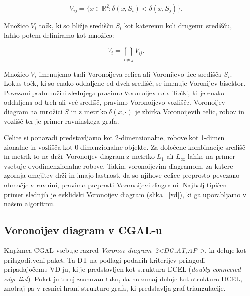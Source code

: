 \documentclass[a4paper, 12pt]{book}
\newcommand{\U}{\texttt{\_}}
\begin{document}
\begin{equation}
V_{ij} = \{x \in \mathbb{R}^2: \delta(x,S_i) < \delta(x,S_j)\}. 
\end{equation}

Množico $V_i$ točk, ki so bližje središču $S_i$ kot kateremu koli drugemu središču, lahko potem definiramo kot množico:

\begin{equation}
V_i = \bigcap_{i \neq j} V_{ij} .
\end{equation}

Množico $V_i$ imenujemo tudi Voronoijeva celica ali Voronijevo lice središča $S_i$. Lokus točk, ki so enako oddaljene od dveh središč, se imenuje Voronijev bisektor. Povezani podmnožici slednjega pravimo Voronoijev rob. Točki, ki je enako oddaljena od treh ali več središč, pravimo Voronoijevo vozlišče. Voronoijev diagram na množici $S$ in z metriko $\delta(x,\cdot)$ je zbirka Voronoijevih celic, robov in vozlišč ter je primer ravninskega grafa.

Celice si ponavadi predstavljamo kot 2-dimenzionalne, robove kot 1-dimen\- zionalne in vozlišča kot 0-dimenzionalne objekte. Za določene kombinacije središč in metrik to ne drži. Voronoijev diagram z metriko $L_1$ ali $L_{\infty}$ lahko na primer vsebuje dvodimenzionalne robove. Takim voronoijevim diagramom, za katere zgornja omejitev drži in imajo lastnost, da so njihove celice preprosto povezano območje v ravnini, pravimo preprosti Voronoijevi diagrami. Najbolj tipičen primer slednjih je evklidski Voronoijev diagram (slika ~\ref{vd}), ki ga uporabljamo v našem algoritmu.

\subsection{Voronoijev diagram v CGAL-u}
Knjižnica CGAL vsebuje razred \textit{Voronoi\U diagram\U 2\textless DG,AT,AP \textgreater}, ki deluje kot prilagoditveni paket. Ta DT na podlagi podanih kriterijev prilagodi pripadajočemu VD-ju, ki je predstavljen kot struktura DCEL (\textit{doubly connected edge list}). Paket je torej zasnovan tako, da na zunaj deluje kot struktura DCEL, znotraj pa v resnici hrani strukturo grafa, ki predstavlja graf triangulacije.
\end{document}
